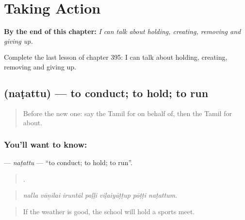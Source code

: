 
\chapter{Taking Action}
\label{ch:ta-taking-action}

\begin{chapteropening}
\textbf{By the end of this chapter:} \emph{I can talk about holding, creating, removing and giving up.}

Complete the last lesson of chapter 395: I can talk about holding, creating, removing and giving up.
\end{chapteropening}

\section[\texorpdfstring{\ta{நடத்து} (naṭattu)}{நடத்து (naṭattu)}]{ (naṭattu) — to conduct; to hold; to run}

\label{lesson:TA-C395-natattu}



\begin{quote}
Before the new one: say the Tamil for on behalf of, then the Tamil for about.
\end{quote}

\subsection*{You'll want to know: }
\textbf{} — \emph{naṭattu} — \textquotedblleft{}to conduct; to hold; to run\textquotedblright{}.

\begin{quote}
      .
\end{quote}

\begin{quote}
\emph{nalla vāṉilai iruntāl paḷḷi viḷaiyāṭṭup pōṭṭi naṭattum.}
\end{quote}

\begin{quote}
If the weather is good, the school will hold a sports meet.
\end{quote}

